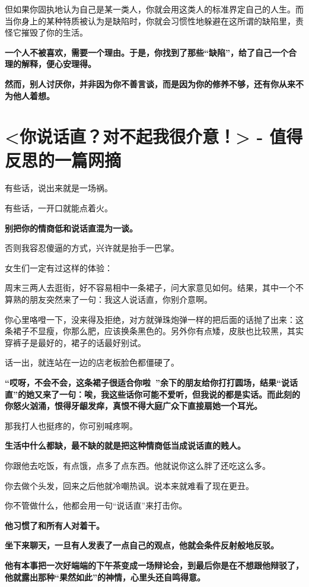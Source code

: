 \documentclass[UTF8,a4paper,8pt]{ctexbook}
\begin{document}
	但如果你固执地认为自己是某一类人，你就会用这类人的标准界定自己的人生。而当你身上的某种特质被认为是缺陷时，你就会习惯性地躲避在这所谓的缺陷里，责怪它摧毁了你的生活。
	
	\textbf{一个人不被喜欢，需要一个理由。于是，你找到了那些“缺陷”，给了自己一个合理的解释，便心安理得。}
	
	\textbf{然而，别人讨厌你，并非因为你不善言谈，而是因为你的修养不够，还有你从来不为他人着想。}


\newpage
\section{<你说话直？对不起我很介意！> - 值得反思的一篇网摘}
	有些话，说出来就是一场祸。
	
	有些话，一开口就能点着火。
	
	\textbf{别把你的情商低和说话直混为一谈。}
	
	否则我容忍傻逼的方式，兴许就是抬手一巴掌。
	
	女生们一定有过这样的体验：
	
	周末三两人去逛街，好不容易相中一条裙子，问大家意见如何。结果，其中一个不算熟的朋友突然来了一句：我这人说话直，你别介意啊。
	
	你心里咯噔一下，没来得及拒绝，对方就弹珠炮弹一样的把后面的话抛了出来：这条裙子不显瘦，你那么肥，应该换条黑色的。另外你有点矮，皮肤也比较黑，其实穿裤子是最好的，裙子的话最好别试。
	
	话一出，就连站在一边的店老板脸色都僵硬了。
	
	\textbf{“哎呀，不会不会，这条裙子很适合你啦~”余下的朋友给你打打圆场，结果“说话直”的她又来了一句：唉，我这些话你可能不爱听，但我说的都是实话。而此刻的你怒火汹涌，恨得牙龈发痒，真恨不得大庭广众下直接扇她一个耳光。}
	
	
	
	那我打人也挺疼的，你可别喊疼啊。
	
	\textbf{生活中什么都缺，最不缺的就是把这种情商低当成说话直的贱人。}
	
	你跟他去吃饭，有点饿，点多了点东西。他就说你这么胖了还吃这么多。
	
	你去做个头发，回来之后他就冷嘲热讽。说本来就难看了现在更丑。
	
	你不管做什么，他都会用一句“说话直”来打击你。
	
	\textbf{他习惯了和所有人对着干。}
	
	\textbf{坐下来聊天，一旦有人发表了一点自己的观点，他就会条件反射般地反驳。}
	
	\textbf{他有本事把一次好端端的下午茶变成一场辩论会，到最后你是在不想跟他辩驳了，他就露出那种“果然如此”的神情，心里头还自鸣得意。}
	
\end{document}
